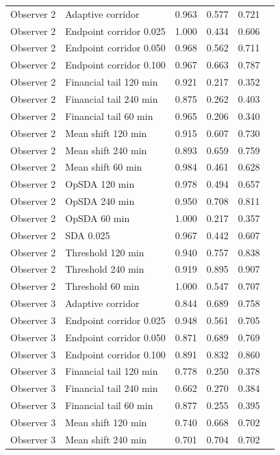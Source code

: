 \documentclass[a4paper,11pt]{article}
\begin{document}
{\begin{longtable}[]{@{}llrrrl@{}}
Observer 2 & Adaptive corridor & 0.963 & 0.577 & 0.721 & \\
Observer 2 & Endpoint corridor 0.025 & 1.000 & 0.434 & 0.606 & \\
Observer 2 & Endpoint corridor 0.050 & 0.968 & 0.562 & 0.711 & \\
Observer 2 & Endpoint corridor 0.100 & 0.967 & 0.663 & 0.787 & \\
Observer 2 & Financial tail 120 min & 0.921 & 0.217 & 0.352 & \\
Observer 2 & Financial tail 240 min & 0.875 & 0.262 & 0.403 & \\
Observer 2 & Financial tail 60 min & 0.965 & 0.206 & 0.340 & \\
Observer 2 & Mean shift 120 min & 0.915 & 0.607 & 0.730 & \\
Observer 2 & Mean shift 240 min & 0.893 & 0.659 & 0.759 & \\
Observer 2 & Mean shift 60 min & 0.984 & 0.461 & 0.628 & \\
Observer 2 & OpSDA 120 min & 0.978 & 0.494 & 0.657 & \\
Observer 2 & OpSDA 240 min & 0.950 & 0.708 & 0.811 & \\
Observer 2 & OpSDA 60 min & 1.000 & 0.217 & 0.357 & \\
Observer 2 & SDA 0.025 & 0.967 & 0.442 & 0.607 & \\
Observer 2 & Threshold 120 min & 0.940 & 0.757 & 0.838 & \\
Observer 2 & Threshold 240 min & 0.919 & 0.895 & 0.907 & \\
Observer 2 & Threshold 60 min & 1.000 & 0.547 & 0.707 & \\
Observer 3 & Adaptive corridor & 0.844 & 0.689 & 0.758 & \\
Observer 3 & Endpoint corridor 0.025 & 0.948 & 0.561 & 0.705 & \\
Observer 3 & Endpoint corridor 0.050 & 0.871 & 0.689 & 0.769 & \\
Observer 3 & Endpoint corridor 0.100 & 0.891 & 0.832 & 0.860 & \\
Observer 3 & Financial tail 120 min & 0.778 & 0.250 & 0.378 & \\
Observer 3 & Financial tail 240 min & 0.662 & 0.270 & 0.384 & \\
Observer 3 & Financial tail 60 min & 0.877 & 0.255 & 0.395 & \\
Observer 3 & Mean shift 120 min & 0.740 & 0.668 & 0.702 & \\
Observer 3 & Mean shift 240 min & 0.701 & 0.704 & 0.702 & \\

\end{longtable}}
\end{document}
